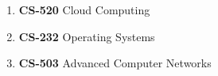 \begin{enumerate}

\item
\textbf{CS-520} Cloud Computing

\item
\textbf{CS-232} Operating Systems

\item
\textbf{CS-503} Advanced Computer Networks

\end{enumerate}